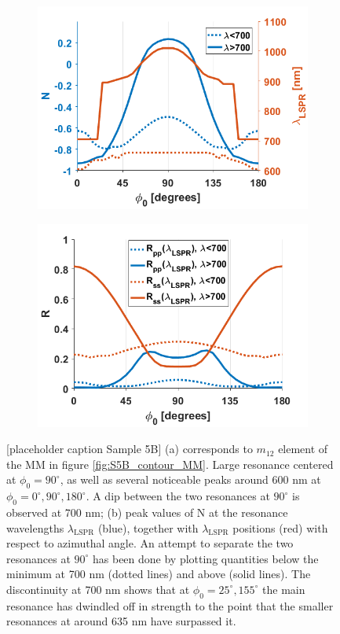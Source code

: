 \begin{figure}[h]
    \begin{subfigure}{0.49\textwidth}
        \centering
        \includegraphics[width=\linewidth]{figures/ch4/S5B/LSPR/N@LSPR(2).png}
        \caption{}
        \label{}
    \end{subfigure}
    \begin{subfigure}{0.49\textwidth}
        \centering
        \includegraphics[width=\linewidth]{figures/ch4/S5B/LSPR/RppRss@LSPR.png}
        \caption{}
        \label{}
    \end{subfigure}
    \caption{[placeholder caption Sample 5B] (a) corresponds to $m_{12}$ element of the MM in figure \ref{fig:S5B_contour_MM}. Large resonance centered at $\phi_0=90^\circ$, as well as several noticeable peaks around 600 nm at $\phi_0=0^\circ,90^\circ,180^\circ$. A dip between the two resonances at $90^\circ$ is observed at 700 nm; (b) peak values of N at the resonance wavelengths $\lambda_{\text{LSPR}}$ (blue), together with $\lambda_{\text{LSPR}}$ positions (red) with respect to azimuthal angle. An attempt to separate the two resonances at $90^\circ$ has been done by plotting quantities below the minimum at 700 nm (dotted lines) and above (solid lines). The discontinuity at 700 nm shows that at $\phi_0=25^\circ,155^\circ$ the main resonance has dwindled off in strength to the point that the smaller resonances at around 635 nm have surpassed it.}

\end{figure}
